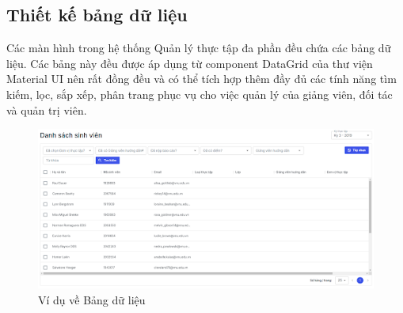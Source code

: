 \documentclass[./../main.tex]{subfiles}
\begin{document}
\subsection{Thiết kế bảng dữ liệu}

Các màn hình trong hệ thống Quản lý thực tập đa phần đều chứa các bảng dữ liệu. Các bảng này đều được áp dụng từ component DataGrid của thư viện Material UI nên rất đồng đều và có thể tích hợp thêm đầy đủ các tính năng tìm kiếm, lọc, sắp xếp, phân trang phục vụ cho việc quản lý của giảng viên, đối tác và quản trị viên.

\begin{figure}[H]
	\includegraphics[width=\linewidth]{./images/image36.png}
	\caption{Ví dụ về Bảng dữ liệu}
	\label{fig:example_data_table}
\end{figure}
\end{document}
